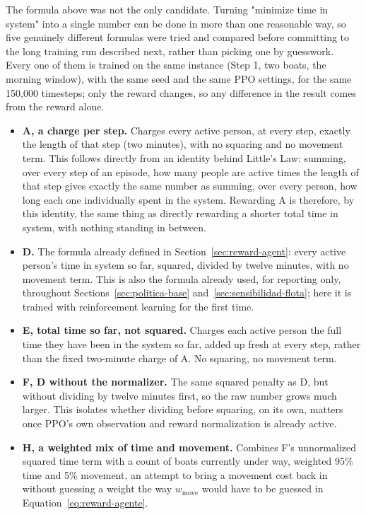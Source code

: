 \documentclass[11pt,a4paper]{article}
\begin{document}
The formula above was not the only candidate. Turning "minimize time in system" into a single number can be done in more than one reasonable way, so five genuinely different formulas were tried and compared before committing to the long training run described next, rather than picking one by guesswork. Every one of them is trained on the same instance (Step 1, two boats, the morning window), with the same seed and the same PPO settings, for the same 150{,}000 timesteps; only the reward changes, so any difference in the result comes from the reward alone.

\begin{itemize}
\item \textbf{A, a charge per step.} Charges every active person, at every step, exactly the length of that step (two minutes), with no squaring and no movement term. This follows directly from an identity behind Little's Law: summing, over every step of an episode, how many people are active times the length of that step gives exactly the same number as summing, over every person, how long each one individually spent in the system. Rewarding A is therefore, by this identity, the same thing as directly rewarding a shorter total time in system, with nothing standing in between.
\item \textbf{D.} The formula already defined in Section~\ref{sec:reward-agent}: every active person's time in system so far, squared, divided by twelve minutes, with no movement term. This is also the formula already used, for reporting only, throughout Sections~\ref{sec:politica-base} and~\ref{sec:sensibilidad-flota}; here it is trained with reinforcement learning for the first time.
\item \textbf{E, total time so far, not squared.} Charges each active person the full time they have been in the system so far, added up fresh at every step, rather than the fixed two-minute charge of A. No squaring, no movement term.
\item \textbf{F, D without the normalizer.} The same squared penalty as D, but without dividing by twelve minutes first, so the raw number grows much larger. This isolates whether dividing before squaring, on its own, matters once PPO's own observation and reward normalization is already active.
\item \textbf{H, a weighted mix of time and movement.} Combines F's unnormalized squared time term with a count of boats currently under way, weighted 95\% time and 5\% movement, an attempt to bring a movement cost back in without guessing a weight the way $w_{\text{move}}$ would have to be guessed in Equation~\ref{eq:reward-agente}.
\end{itemize}
\end{document}
